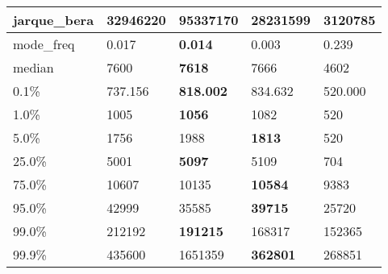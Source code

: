 \begin{table}[H]
\begin{tabular}{|l|m{10em}|m{10em}|m{10em}|m{10em}|}
\hline jarque\_bera & 32946220 & \cellcolor[rgb]{0.9, 0.54, 0.52} 95337170 & \bfseries 28231599 & 3120785 \\
\hline mode\_freq & 0.017 & \bfseries 0.014 & 0.003 & \cellcolor[rgb]{0.9, 0.54, 0.52} 0.239 \\
\hline median & 7600 & \bfseries 7618 & 7666 & \cellcolor[rgb]{0.9, 0.54, 0.52} 4602 \\
\hline 0.1\% & 737.156 & \bfseries 818.002 & 834.632 & \cellcolor[rgb]{0.9, 0.54, 0.52} 520.000 \\
\hline 1.0\% & 1005 & \bfseries 1056 & 1082 & \cellcolor[rgb]{0.9, 0.54, 0.52} 520 \\
\hline 5.0\% & 1756 & 1988 & \bfseries 1813 & \cellcolor[rgb]{0.9, 0.54, 0.52} 520 \\
\hline 25.0\% & 5001 & \bfseries 5097 & 5109 & \cellcolor[rgb]{0.9, 0.54, 0.52} 704 \\
\hline 75.0\% & 10607 & 10135 & \bfseries 10584 & \cellcolor[rgb]{0.9, 0.54, 0.52} 9383 \\
\hline 95.0\% & 42999 & 35585 & \bfseries 39715 & \cellcolor[rgb]{0.9, 0.54, 0.52} 25720 \\
\hline 99.0\% & 212192 & \bfseries 191215 & 168317 & \cellcolor[rgb]{0.9, 0.54, 0.52} 152365 \\
\hline 99.9\% & 435600 & \cellcolor[rgb]{0.9, 0.54, 0.52} 1651359 & \bfseries 362801 & 268851 \\
\hline
\end{tabular}
\end{table}
